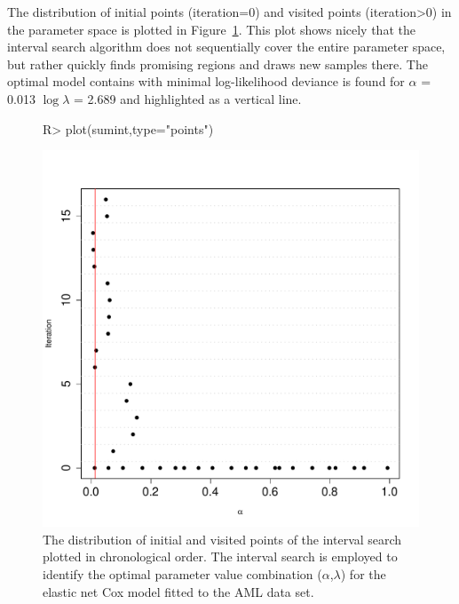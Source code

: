 \documentclass[]{jss}
\begin{document}
The distribution of initial points (iteration=0) and visited points (iteration>0) in the parameter space is plotted in Figure~\ref{fig:interval_search2}.
This plot shows nicely that the interval search algorithm does not sequentially cover the entire parameter space, but rather quickly finds promising regions and draws new samples there. The optimal model contains with minimal log-likelihood deviance is found for $\alpha$ = 0.013 $\log\lambda$ = 2.689 and highlighted as a vertical line.

\begin{figure}[t!]
\begin{center}
\begin{Schunk}
\begin{Sinput}
R> plot(sumint,type="points") 
\end{Sinput}
\end{Schunk}
\includegraphics{c060_vignette-interval_search_cox_out_plot2}
\end{center}
\caption{The distribution of initial and visited points of the interval search plotted in chronological order. The interval search is employed to identify the optimal parameter value combination ($\alpha$,$\lambda$) for the elastic net Cox model fitted to the AML data set.}
\label{fig:interval_search2}
\end{figure}
\end{document}
